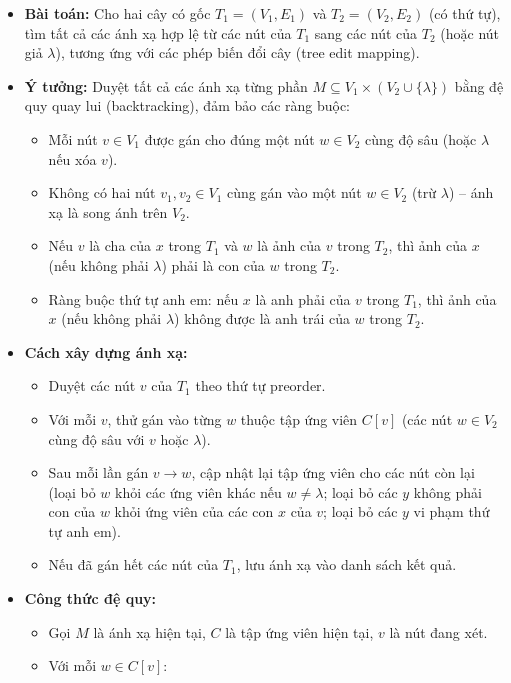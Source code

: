 \documentclass{article}
\begin{document}
\begin{itemize}
    \item \textbf{Bài toán:} Cho hai cây có gốc $T_1 = (V_1, E_1)$ và $T_2 = (V_2, E_2)$ (có thứ tự), tìm tất cả các ánh xạ hợp lệ từ các nút của $T_1$ sang các nút của $T_2$ (hoặc nút giả $\lambda$), tương ứng với các phép biến đổi cây (tree edit mapping).
    \item \textbf{Ý tưởng:} Duyệt tất cả các ánh xạ từng phần $M \subseteq V_1 \times (V_2 \cup \{\lambda\})$ bằng đệ quy quay lui (backtracking), đảm bảo các ràng buộc:
    \begin{itemize}
        \item Mỗi nút $v \in V_1$ được gán cho đúng một nút $w \in V_2$ cùng độ sâu (hoặc $\lambda$ nếu xóa $v$).
        \item Không có hai nút $v_1, v_2 \in V_1$ cùng gán vào một nút $w \in V_2$ (trừ $\lambda$) -- ánh xạ là song ánh trên $V_2$.
        \item Nếu $v$ là cha của $x$ trong $T_1$ và $w$ là ảnh của $v$ trong $T_2$, thì ảnh của $x$ (nếu không phải $\lambda$) phải là con của $w$ trong $T_2$.
        \item Ràng buộc thứ tự anh em: nếu $x$ là anh phải của $v$ trong $T_1$, thì ảnh của $x$ (nếu không phải $\lambda$) không được là anh trái của $w$ trong $T_2$.
    \end{itemize}
    \item \textbf{Cách xây dựng ánh xạ:}
    \begin{itemize}
        \item Duyệt các nút $v$ của $T_1$ theo thứ tự preorder.
        \item Với mỗi $v$, thử gán vào từng $w$ thuộc tập ứng viên $C[v]$ (các nút $w \in V_2$ cùng độ sâu với $v$ hoặc $\lambda$).
        \item Sau mỗi lần gán $v \to w$, cập nhật lại tập ứng viên cho các nút còn lại (loại bỏ $w$ khỏi các ứng viên khác nếu $w \neq \lambda$; loại bỏ các $y$ không phải con của $w$ khỏi ứng viên của các con $x$ của $v$; loại bỏ các $y$ vi phạm thứ tự anh em).
        \item Nếu đã gán hết các nút của $T_1$, lưu ánh xạ vào danh sách kết quả.
    \end{itemize}
    \item \textbf{Công thức đệ quy:}
    \begin{itemize}
        \item Gọi $M$ là ánh xạ hiện tại, $C$ là tập ứng viên hiện tại, $v$ là nút đang xét.
        \item Với mỗi $w \in C[v]$:

\end{itemize}
\end{itemize}
\end{document}
